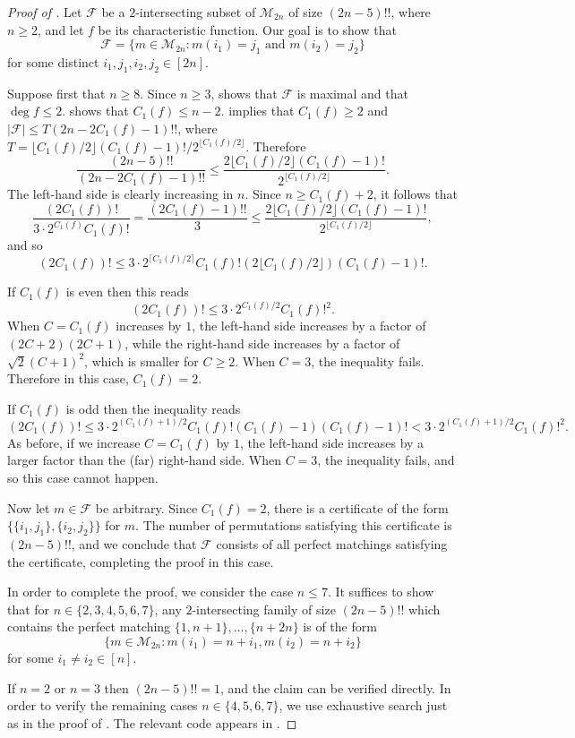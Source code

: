 \documentclass{article}
\theoremstyle{definition}
\providecommand{\cM}{\mathcal{M}}
\begin{document}
\begin{proof}[Proof of ]
Let $\mathcal{F}$ be a $2$-intersecting subset of $\cM_{2n}$ of size $(2n-5)!!$, where $n \geq 2$, and let $f$ be its characteristic function. Our goal is to show that
\[
 \mathcal{F} = \{ m \in \cM_{2n} : m(i_1) = j_1 \text{ and } m(i_2) = j_2 \}
\]
for some distinct $i_1,j_1,i_2,j_2 \in [2n]$.

Suppose first that $n \geq 8$. Since $n \geq 3$,  shows that $\mathcal{F}$ is maximal and that $\deg f \leq 2$.  shows that $C_1(f) \leq n-2$.  implies that $C_1(f) \geq 2$ and  $|\mathcal{F}| \leq T (2n - 2C_1(f) - 1)!!$, where $T = \lfloor C_1(f)/2 \rfloor (C_1(f) - 1)!/2^{\lfloor C_1(f)/2 \rfloor}$. Therefore
\[
 \frac{(2n-5)!!}{(2n - 2C_1(f) - 1)!!} \leq \frac{2\lfloor C_1(f)/2 \rfloor (C_1(f) - 1)!}{2^{\lfloor C_1(f)/2 \rfloor}}.
\]
The left-hand side is clearly increasing in $n$. Since $n \geq C_1(f) + 2$, it follows that
\[
 \frac{(2C_1(f))!}{3 \cdot 2^{C_1(f)} C_1(f)!} =
 \frac{(2C_1(f) - 1)!!}{3} \leq \frac{2\lfloor C_1(f)/2 \rfloor (C_1(f) - 1)!}{2^{\lfloor C_1(f)/2 \rfloor}},
\]
and so 
\[
 (2C_1(f))! \leq 3 \cdot 2^{\lceil C_1(f)/2 \rceil} C_1(f)! (2\lfloor C_1(f)/2 \rfloor) (C_1(f) - 1)!.
\]

If $C_1(f)$ is even then this reads
\[
 (2C_1(f))! \leq 3 \cdot 2^{C_1(f)/2} C_1(f)!^2.
\]
When $C = C_1(f)$ increases by $1$, the left-hand side increases by a factor of $(2C+2)(2C+1)$, while the right-hand side increases by a factor of $\sqrt{2} (C+1)^2$, which is smaller for $C \geq 2$. When $C = 3$, the inequality fails. Therefore in this case, $C_1(f) = 2$.

If $C_1(f)$ is odd then the inequality reads
\[
 (2C_1(f))! \leq 3 \cdot 2^{(C_1(f)+1)/2} C_1(f)! (C_1(f) - 1)(C_1(f) - 1)! < 3 \cdot 2^{(C_1(f)+1)/2} C_1(f)!^2.
\]
As before, if we increase $C = C_1(f)$ by $1$, the left-hand side increases by a larger factor than the (far) right-hand side. When $C = 3$, the inequality fails, and so this case cannot happen.

Now let $m \in \mathcal{F}$ be arbitrary. Since $C_1(f) = 2$, there is a certificate of the form $\bigl\{\{i_1,j_1\},\{i_2,j_2\}\bigr\}$ for $m$. The number of permutations satisfying this certificate is $(2n-5)!!$, and we conclude that $\mathcal{F}$ consists of all perfect matchings satisfying the certificate, completing the proof in this case.

\smallskip

In order to complete the proof, we consider the case $n \leq 7$. It suffices to show that for $n \in \{2,3,4,5,6,7\}$, any $2$-intersecting family of size $(2n-5)!!$ which contains the perfect matching $\{1,n+1\},\ldots,\{n+2n\}$ is of the form
\[
 \{ m \in \cM_{2n} : m(i_1) = n + i_1, m(i_2) = n + i_2 \}
\]
for some $i_1 \neq i_2 \in [n]$.

If $n = 2$ or $n = 3$ then $(2n-5)!! = 1$, and the claim can be verified directly. In order to verify the remaining cases $n \in \{4,5,6,7\}$, we use exhaustive search just as in the proof of . The relevant code appears in .
\end{proof}
\end{document}
